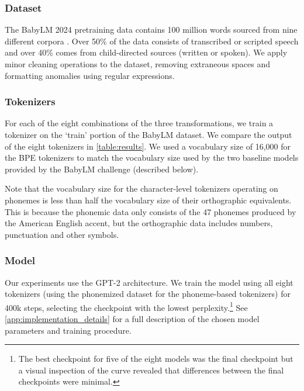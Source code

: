 \subsubsection{Dataset}
\label{sec:input}

The BabyLM 2024 pretraining data contains 100 million words sourced from nine different corpora \citep{warstadt-2023-babylm-findings}. Over 50\% of the data consists of transcribed or scripted speech and over 40\% comes from child-directed sources (written or spoken). %
We apply minor cleaning operations to the dataset, removing extraneous spaces and formatting anomalies using regular expressions.

\subsubsection{Tokenizers}
\label{sec:tokenizers}

For each of the eight combinations of the three transformations, we train a tokenizer on the `train' portion of the BabyLM dataset.
We compare the output of the eight tokenizers in \cref{table:results}. We used a vocabulary size of 16,000 for the BPE tokenizers to match the vocabulary size used by the two baseline models provided by the BabyLM challenge (described below). 

Note that the vocabulary size for the character-level tokenizers operating on phonemes is less than half the vocabulary size of their orthographic equivalents. This is because the phonemic data only consists of the 47 phonemes produced by the American English accent, but the orthographic data includes numbers, punctuation and other symbols. 

\subsubsection{Model}
\label{sec:model}

Our experiments use the GPT-2 architecture. We train the model using all eight tokenizers (using the phonemized dataset for the phoneme-based tokenizers) for 400k steps, selecting the checkpoint with the lowest perplexity.\footnote{The best checkpoint for five of the eight models was the final checkpoint but a visual inspection of the curve revealed that differences between the final checkpoints were minimal.} See \cref{app:implementation_details} for a full description of the chosen model parameters and training procedure.

